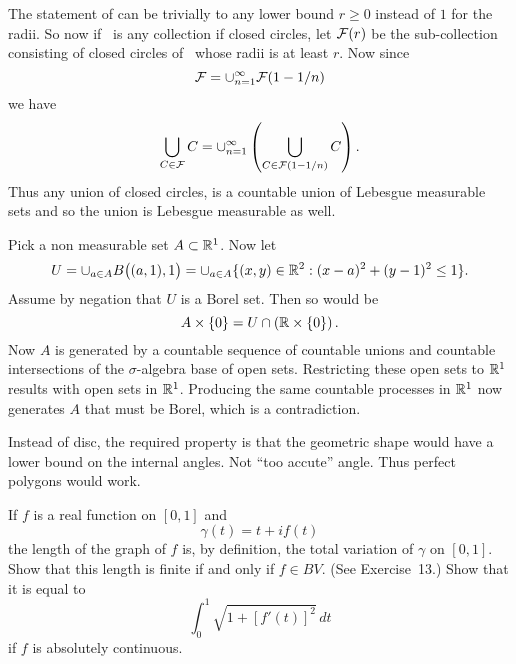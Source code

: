 \begin{enumerate}
\begin{itemize}
The statement of  can 
be trivially to any lower bound \(r\geq 0\) instead of $1$ for the radii.
So now if \calF\ is any collection if closed circles,
let \(\mathcal{F}(r)\) be the sub-collection consisting of closed circles 
of \calF\ whose radii is at least $r$.
Now since
\begin{equation*}
\mathcal{F} = \cup_{n=1}^\infty \mathcal{F}(1 - 1/n)
\end{equation*}
we have
\begin{equation*}
\bigcup_{C\in\mathcal{F}} C
= \cup_{n=1}^\infty \left(\bigcup_{C\in \mathcal{F}(1 - 1/n)} C\right).
\end{equation*}
Thus any union of closed circles, is a countable union of 
Lebesgue measurable sets
and so the union is Lebesgue measurable as well.

Pick a non measurable set \(A\subset \mathbb{R}^1\). Now let
\begin{equation*}
U 
= \cup_{a\in A} B\bigl((a,1),1\bigr)
= \cup_{a\in A} \{(x,y)\in\mathbb{R}^2: (x-a)^2+(y-1)^2 \leq 1\}.
\end{equation*}
Assume by negation that $U$ is a Borel set. Then so would be
\begin{equation*}
A \times \{0\} = U \cap \left(\mathbb{R}\times \{0\}\right).
\end{equation*}
Now $A$ is generated by a countable sequence of countable unions
and countable intersections of the 
\(\sigma\)-algebra base of open sets. Restricting these open sets to \(\mathbb{R}^1\)
results with open sets in \(\mathbb{R}^1\). Producing the same countable processes
in \(\mathbb{R}^1\) now generates $A$ that must be Borel, which is a contradiction.


Instead of disc, the required property is that the geometric shape
would have a lower bound on the internal angles. Not ``too accute'' angle.
Thus perfect polygons would work.
\end{itemize}

\begin{excopy}
  If $f$ is a real function on \([0,1]\) and
\begin{equation*}
  \gamma(t) = t + if(t)
\end{equation*}
the length of the graph of $f$ is, by definition, the total variation
of \(\gamma\) on \([0,1]\). Show that this length is finite if and
only if \(f\in BV\).  (See Exercise~13.)  Show that it is equal to
\begin{equation*}
  \int_0^1 \sqrt{1 + [f'(t)]^2}\,dt
\end{equation*}
if $f$ is absolutely continuous.
\end{excopy}



\end{enumerate}
